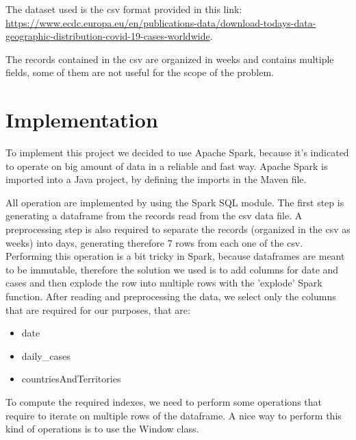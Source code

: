 \documentclass[10pt]{article}
\begin{document}
	The dataset used is the csv format provided in this link:\\
	\url{https://www.ecdc.europa.eu/en/publications-data/download-todays-data-geographic-distribution-covid-19-cases-worldwide}.
	
	The records contained in the csv are organized in weeks and contains multiple fields, some of them are not useful for the scope of the problem.
	
	\section{Implementation}
	To implement this project we decided to use Apache Spark, because it's indicated to operate on big amount of data in a reliable and fast way. Apache Spark is imported into a Java project, by defining the imports in the Maven file.
	
	All operation are implemented by using the Spark SQL module. The first step is generating a dataframe from the records read from the csv data file. A preprocessing step is also required to separate the records (organized in the csv as weeks) into days, generating therefore 7 rows from each one of the csv. Performing this operation is a bit tricky in Spark, because dataframes are meant to be immutable, therefore the solution we used is to add columns for date and cases and then explode the row into multiple rows with the 'explode' Spark function. After reading and preprocessing the data, we select only the columns that are required for our purposes, that are:
	\begin{itemize}
		\item date
		\item daily\_cases
		\item countriesAndTerritories
	\end{itemize}
	
	To compute the required indexes, we need to perform some operations that require to iterate on multiple rows of the dataframe. A nice way to perform this kind of operations is to use the Window class.
	
\end{document}
